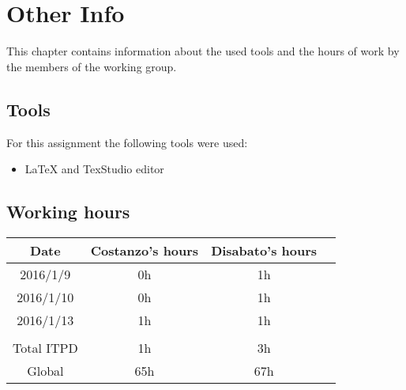 \documentclass[\mainpath/main]{subfiles}
\begin{document}
\chapter{Other Info}
\label{OtherInfo}

\setmyfancystyle

This chapter contains information about the used tools and the hours of work by the members of the working group.

\section{Tools}
For this assignment the following tools were used:
\begin{itemize}
	\item \LaTeX{} and TexStudio editor
\end{itemize}

\section{Working hours}
\begin{table}[h!]
	\centering
\begin{tabular}{cccc}
\hline
Date       & Costanzo's hours & Disabato's hours  & \\ \hline
2016/1/9 & 0h 			  & 1h 			  & \\ \hline
2016/1/10 & 0h 			  & 1h 			  & \\ \hline
2016/1/13 & 1h 			  & 1h 			  & \\ \hline

\\
Total ITPD  & 1h 		      & 3h 			 	  & \\ \hline
Global 	   & 65h 		 	  & 67h 			  & \\ \hline

\end{tabular}
\end{table}
\end{document}
